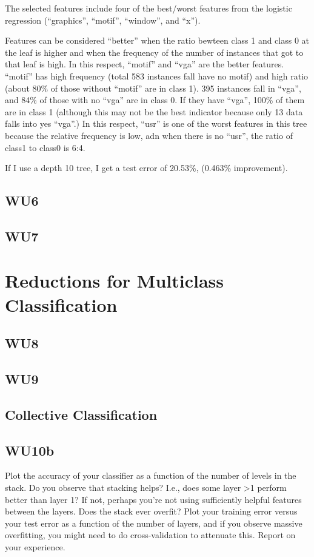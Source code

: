 \documentclass[a4paper,11pt]{article}
\begin{document}
The selected features include four of the best/worst features from
the logistic regression (``graphics'', ``motif'', ``window'', and ``x'').

Features can be considered ``better'' when the ratio bewteen class 1
and class 0 at the leaf is higher and when the frequency of the number
of instances that got to that leaf is high. In this respect, ``motif''
and ``vga'' are the better features. ``motif'' has high frequency
(total 583 instances fall have no motif) and high ratio (about 80\% of
those without ``motif'' are in class 1).  395 instances fall in
``vga'', and 84\% of those with no ``vga'' are in class 0. If they
have ``vga'', 100\% of them are in class 1 (although this may not be the
best indicator because only 13 data falls into yes ``vga''.) 
In this respect, ``usr'' is one of the worst features in this tree
because the relative frequency is low, adn when there is no ``usr'',
the ratio of class1 to class0 is 6:4.

If I use a depth 10 tree, I get a test error of 20.53\%, (0.463\%
improvement).

\subsection{WU6}
\textsf{}

\subsection{WU7}
\textsf{}

\section{Reductions for Multiclass Classification}
\subsection{WU8}
\textsf{}

\subsection{WU9}
\textsf{}
\pagebreak
\subsection{Collective Classification}
\subsection{WU10b}
\textsf{Plot the accuracy of your classifier as a function
  of the number of levels in the stack. Do you observe that stacking
  helps? I.e., does some layer >1 perform better than layer 1? If not,
  perhaps you're not using sufficiently helpful features between the
  layers. Does the stack ever overfit? Plot your training error versus
  your test error as a function of the number of layers, and if you
  observe massive overfitting, you might need to do cross-validation
  to attenuate this. Report on your experience.}\\
\end{document}

